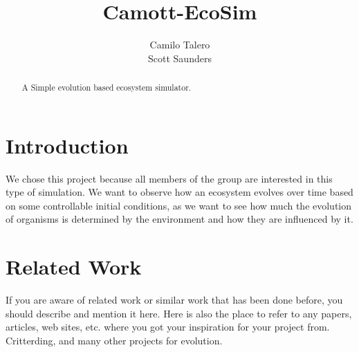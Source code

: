 \documentclass[runningheads]{llncs}
\begin{document}
\title{Camott-EcoSim}

\author{Camilo Talero \\  Scott Saunders  }


\maketitle


\begin{abstract} 
A Simple evolution based ecosystem simulator.
\end{abstract}


\section{Introduction}
\label{sec:Introduction}
%
We chose this project because all members of the group are interested in this type of simulation. We want to observe how an ecosystem evolves over time based on some controllable initial conditions, as we want to see how much the evolution of organisms is determined by the environment and how they are influenced by it.

\section{Related Work}
If you are aware of related work or similar work that has been done before, you should describe and mention it here. Here is also the place to refer to any papers, articles, web sites, etc. where you got your inspiration for your project from.
Critterding, and many other projects for evolution.
\end{document}
